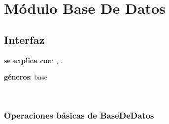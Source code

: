 \section{M\'odulo Base De Datos}

\subsection{Interfaz}

\textbf{se explica con}: , .

\textbf{géneros}: base


~


\subsubsection{Operaciones b\'asicas de BaseDeDatos}

